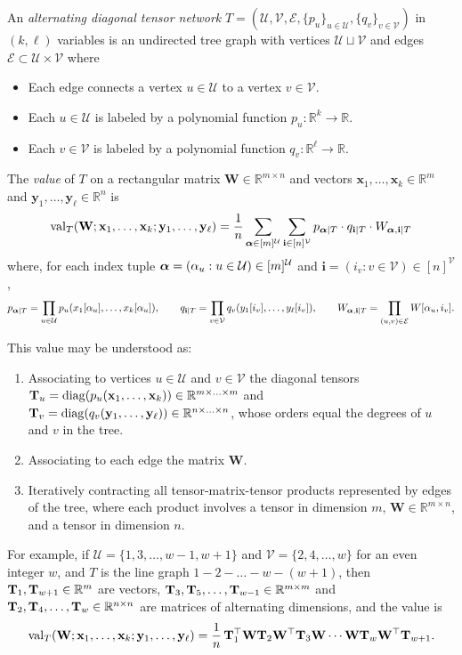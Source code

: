 \documentclass[10pt,reqno]{amsart}
\def\a{\alpha}
\def\x{\mathbf{x}}
\def\y{\mathbf{y}}
\def\W{\mathbf{W}}
\def\R{\mathbb{R}}
\def\cU{\mathcal{U}}
\def\cV{\mathcal{V}}
\def\cE{\mathcal{E}}
\def\diag{\operatorname{diag}}
\def\val{\operatorname{val}}
\def\bi{\mathbf{i}}
\begin{document}
\begin{definition}
An \emph{alternating diagonal tensor network} $T=(\cU,\cV,\cE,\{p_u\}_{u \in \cU},
\{q_v\}_{v \in \cV})$ in $(k,\ell)$ variables is an undirected tree graph 
with vertices $\cU \sqcup \cV$ and edges $\cE \subset \cU \times \cV$ where
\begin{itemize}
\item Each edge connects a vertex $u \in \cU$ to a vertex $v \in \cV$.
\item Each $u \in \cU$ is labeled by a polynomial function $p_u:\R^k \to \R$.
\item Each $v \in \cV$ is labeled by a polynomial function $q_v:\R^\ell \to \R$.
\end{itemize}
The \emph{value} of $T$ on a rectangular matrix $\W \in \R^{m \times n}$
and vectors $\x_1,\ldots,\x_k \in \R^m$ and $\y_1,\ldots,\y_\ell \in \R^n$ is
\[\val_T(\W;\x_1,\ldots,\x_k;\y_1,\ldots,\y_\ell)
=\frac{1}{n}\sum_{\balpha \in [m]^{\cU}} \sum_{\bi \in [n]^{\cV}}
p_{\balpha|T} \cdot q_{\bi|T} \cdot W_{\balpha,\bi|T}\]
where, for each index tuple $\balpha=(\alpha_u:u \in \cU) \in [m]^{\cU}$ and
$\bi=(i_v:v \in \cV) \in [n]^{\cV}$,
\[p_{\balpha|T}=\prod_{u \in \cU} p_u(x_1[\a_u],\ldots,x_k[\a_u]),
\qquad q_{\bi|T}=\prod_{v \in \cV} q_v(y_1[i_v],\ldots,y_\ell[i_v]),
\qquad W_{\balpha,\bi|T}=\prod_{(u,v) \in \cE} W[\a_u,i_v].\]
\end{definition}

This value may be understood as:
\begin{enumerate}
\item Associating to vertices $u \in \cU$ and $v \in \cV$ the diagonal
tensors $\bT_u=\diag(p_u(\x_1,\ldots,\x_k)) \in \R^{m \times \ldots \times m}$
and $\bT_v=\diag(q_v(\y_1,\ldots,\y_\ell)) \in \R^{n \times \ldots \times n}$,
whose orders equal the degrees of $u$ and $v$ in the tree.
\item Associating to each edge the matrix $\W$.
\item Iteratively contracting all tensor-matrix-tensor products represented by
edges of the tree, where each product involves a tensor in dimension $m$, $\W
\in \R^{m \times n}$, and a tensor in dimension $n$.
\end{enumerate}
For example, if $\cU=\{1,3,\ldots,w-1,w+1\}$ and $\cV=\{2,4,\ldots,w\}$ for an
even integer $w$,
and $T$ is the line graph $1-2-\ldots-w-(w+1)$, then $\bT_1,\bT_{w+1} \in \R^m$
are vectors, $\bT_3,\bT_5,\ldots,\bT_{w-1} \in \R^{m \times m}$ and
$\bT_2,\bT_4,\ldots,\bT_w \in \R^{n \times n}$ are matrices of alternating
dimensions, and the value is
\[\val_T(\W;\x_1,\ldots,\x_k;\y_1,\ldots,\y_\ell)
=\frac{1}{n}\,
\bT_1^\top \W \bT_2 \W^\top \bT_3 \W \cdots \W \bT_w \W^\top \bT_{w+1}.\]
\end{document}
